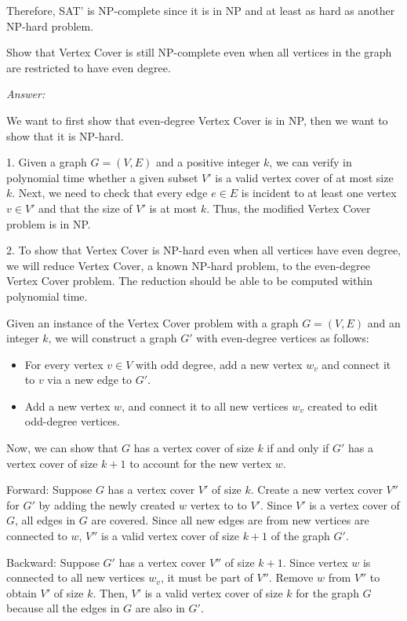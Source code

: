 \documentclass[12pt]{article}
\newenvironment{problem}[2][Problem]{\begin{trivlist}
\item[\hskip \labelsep {\bfseries #1}\hskip \labelsep {\bfseries #2.}]}{\end{trivlist}}
\begin{document}
Therefore, SAT' is NP-complete since it is in NP and at least as hard as another NP-hard problem.

\begin{problem}{4}
    Show that Vertex Cover is still NP-complete even when all vertices in the graph are restricted to have even degree.
\end{problem}

\textit{Answer:} 

We want to first show that even-degree Vertex Cover is in NP, then we want to show that it is NP-hard.

1. Given a graph $G=(V,E)$ and a positive integer $k$, we can verify in polynomial time whether a given subset $V'$ is a valid vertex cover of at most size $k$. Next, we need to check that every edge $e \in E$ is incident to at least one vertex $v\in V'$ and that the size of $V'$ is at most $k$. Thus, the modified Vertex Cover problem is in NP.

2. To show that Vertex Cover is NP-hard even when all vertices have even degree, we will reduce Vertex Cover, a known NP-hard problem, to the even-degree Vertex Cover problem. The reduction should be able to be computed within polynomial time.

Given an instance of the Vertex Cover problem with a graph $G=(V,E)$ and an integer $k$, we will construct a graph $G'$ with even-degree vertices as follows:

\begin{itemize}
    \item For every vertex $v \in V$ with odd degree, add a new vertex $w_v$ and connect it to $v$ via a new edge to $G'$.
    \item Add a new vertex $w$, and connect it to all new vertices $w_v$ created to edit odd-degree vertices.
\end{itemize}

Now, we can show that $G$ has a vertex cover of size $k$ if and only if $G'$ has a vertex cover of size $k+1$ to account for the new vertex $w$.

Forward: Suppose $G$ has a vertex cover $V'$ of size $k$. Create a new vertex cover $V''$ for $G'$ by adding the newly created $w$ vertex to to $V'$. Since $V'$ is a vertex cover of $G$, all edges in $G$ are covered. Since all new edges are from new vertices are connected to $w$, $V''$ is a valid vertex cover of size $k+1$ of the graph $G'$.

Backward: Suppose $G'$ has a vertex cover $V''$ of size $k+1$. Since vertex $w$ is connected to all new vertices $w_v$, it must be part of $V''$. Remove $w$ from $V''$ to obtain $V'$ of size $k$. Then, $V'$ is a valid vertex cover of size $k$ for the graph $G$ because all the edges in $G$ are also in $G'$.
\end{document}
